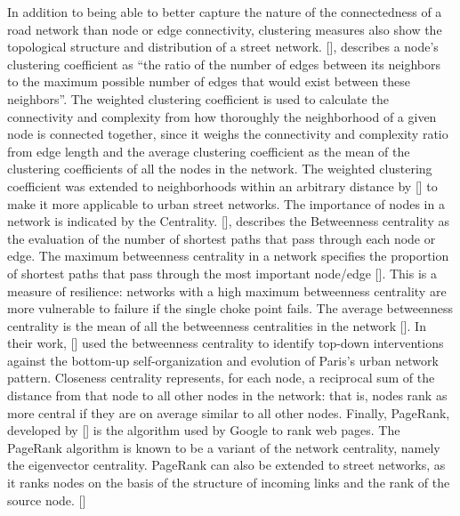 In addition to being able to better capture the nature of the connectedness of a road network than node or edge connectivity, clustering measures also show the topological structure and distribution of a street network. [\cite{Boeing:2017}], describes a node’s clustering coefficient as “the ratio of the number of edges between its neighbors to the maximum possible number of edges that would exist between these neighbors”. The weighted clustering coefficient is used to calculate the connectivity and complexity from how thoroughly the neighborhood of a given node is connected together, since it weighs the connectivity and complexity ratio from edge length and the average clustering coefficient as the mean of the clustering coefficients of all the nodes in the network. The weighted clustering coefficient was extended to neighborhoods within an arbitrary distance by [\cite{Jiang:2004}] to make it more applicable to urban street networks. The importance of nodes in a network is indicated by the Centrality. [\cite{Barthelemy:2004}], describes the Betweenness centrality as the evaluation of the number of shortest paths that pass through each node or edge. The maximum betweenness centrality in a network specifies the  proportion of shortest paths that pass through the most important node/edge [\cite{Boeing:2017}]. This is a measure of resilience: networks with a high maximum betweenness centrality are more vulnerable to failure if the single choke point fails. The average betweenness centrality is the mean of all the betweenness centralities in the network [\cite{Barthelemy:2011}]. In their work, [\cite{Barthelemy:2013}] used the betweenness centrality to identify top-down interventions against the bottom-up self-organization and evolution of Paris's urban network pattern. Closeness centrality represents, for each node, a reciprocal sum of the distance from that node to all other nodes in the network: that is, nodes rank as more central if they are on average similar to all other nodes. Finally, PageRank, developed by [\cite{Brin:1998}] is the algorithm used by Google to rank web pages. The PageRank algorithm is known to be a variant of the network centrality, namely the eigenvector centrality. PageRank can also be extended to street networks, as it ranks nodes on the basis of the structure of incoming links and the rank of the source node. [\cite{Agryzkov:2012, Chin:2015}]

